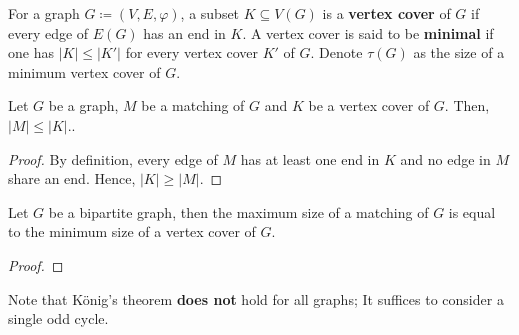 \begin{definition}
	For a graph \(G \coloneqq (V, E, \varphi)\), a subset \(K \subseteq V(G)\) is a \textbf{vertex cover} of \(G\) if every edge of \(E(G)\) has an end in \(K\). 
	A vertex cover is said to be \textbf{minimal} if one has \(|K| \leq |K'|\) for every vertex cover \(K'\) of \(G\).
	Denote \(\tau(G)\) as the size of a minimum vertex cover of \(G\).
\end{definition}

\begin{corollary}
	Let \(G\) be a graph, \(M\) be a matching of \(G\) and \(K\) be a vertex cover of \(G\). 
	Then, \(|M| \leq |K|\)..
\end{corollary}

\begin{proof}
	By definition, every edge of \(M\) has at least one end in \(K\) and no edge in \(M\) share an end.
	Hence, \(|K| \geq |M|\).
\end{proof}

\begin{theorem}
	Let \(G\) be a bipartite graph, then the maximum size of a matching of \(G\) is equal to the minimum size of a vertex cover of \(G\).
\end{theorem}

\begin{proof}

\end{proof}

Note that K\"onig's theorem \textbf{does not} hold for all graphs;
It suffices to consider a single odd cycle.

